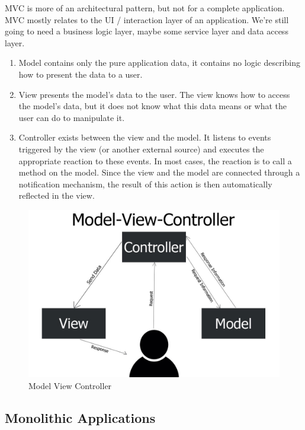 MVC is more of an architectural pattern, but not for a complete application. MVC mostly relates to the \ac{UI} / interaction layer of an application. We’re still going to need a business logic layer, maybe some service layer and data access layer.
\begin{enumerate}
      \item Model contains only the pure application data, it contains no logic describing how to present the data to a user.
      \item View presents the model’s data to the user. The view knows how to access the model’s data, but it does not know what this data means or what the user can do to manipulate it.
      \item Controller exists between the view and the model. It listens to events triggered by the view (or another external source) and executes the appropriate reaction to these events. In most cases, the reaction is to call a method on the model. Since the view and the model are connected through a notification mechanism, the result of this action is then automatically reflected in the view.
\end{enumerate}

\begin{figure}[!ht]
      \center
      \includegraphics[scale=0.25]{assets/mvc.jpg}
      \caption{Model View Controller}
      \label{fig:mvc}
\end{figure}

\subsection{Monolithic Applications}

